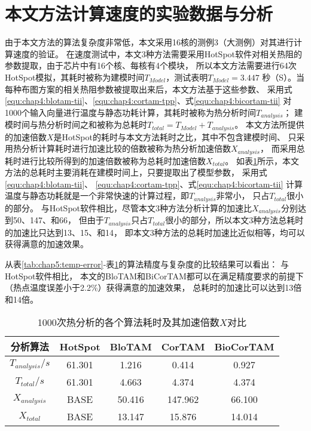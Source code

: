 \section{本文方法计算速度的实验数据与分析}
\label{exp-speedup}
由于本文方法的算法复杂度非常低，本文采用16核的测例3（大测例）对其进行计算速度的验证。 在速度测试中，本文3种方法需要采用HotSpot软件对相关热阻的参数提取，由于芯片中有16个核、每核有4个模块， 所以本文方法需要进行64次HotSpot模拟，其耗时被称为建模时间$T_{Model}$，测试表明$T_{Model} = 3.447$ 秒（S）。当每种布图方案的相关热阻参数被提取出来后，本文方法基于这些参数、 采用式\ref{equ:chap4:blotam-tii}、\ref{equ:chap4:cortam-tpp}、式\ref{equ:chap4:bicortam-tii} 对1000个输入向量进行温度与静态功耗计算，其耗时被称为热分析时间$T_{analysis}$； 建模时间与热分析时间之和被称为总耗时$T_{total}=T_{Model}+T_{analysis}$。 本文方法所提供的加速倍数$X$是HotSpot的耗时与本文方法耗时之比，其中不包含建模时间、 只采用热分析计算耗时进行加速比较的倍数被称为热分析加速倍数$X_{analysis}$， 而采用总耗时进行比较所得到的加速倍数被称为总耗时加速倍数$X_{total}$。
如表\ref{tab:chap5:time-speedup}所示，本文方法的总耗时主要消耗在建模时间上，只要提取出了模型参数， 采用式\ref{equ:chap4:blotam-tii}、 \ref{equ:chap4:cortam-tpp}、式\ref{equ:chap4:bicortam-tii} 计算温度与静态功耗就是一个非常快速的计算过程，即$T_{analysis}$非常小， 只占$T_{total}$很小的部分。 与HotSpot软件相比，尽管本文3种方法分析计算的加速比$X_{analysis}$分别达到50、147、和66， 但由于$T_{analysis}$只占$T_{total}$很小的部分，所以本文3种方法总耗时的加速比只达到13、15、和14， 即本文3种方法的总耗时加速比近似相等，均可以获得满意的加速效果。

从表\ref{tab:chap5:temp-error}-表\ref{tab:chap5:time-speedup}的算法精度与复杂度的比较结果可以看出： 与HotSpot软件相比， 本文的BloTAM和BiCorTAM都可以在满足精度要求的前提下（热点温度误差小于2.2\%）获得满意的加速效果， 总耗时的加速比可以达到13倍和14倍。

\begin{table}
\centering
\caption{1000次热分析的各个算法耗时及其加速倍数$X$对比}
\begin{tabular}{c c c c c}
\hline\hline
分析算法 & HotSpot & BloTAM & CorTAM & BioCorTAM \\ [0.5ex]
\hline
$T_{analysis}/s$ & 61.301 & 1.216 & 0.414 & 0.927 \\
\hline
$T_{total}/s$ & 61.301 & 4.663 & 4.374 & 4.374 \\
\hline
$X_{analysis}$ & BASE & 50.416 & 147.962 & 66.100 \\
\hline
$X_{total}$ & BASE & 13.147 & 15.876 & 14.014 \\
\hline
\end{tabular}
\label{tab:chap5:time-speedup}
\end{table}

